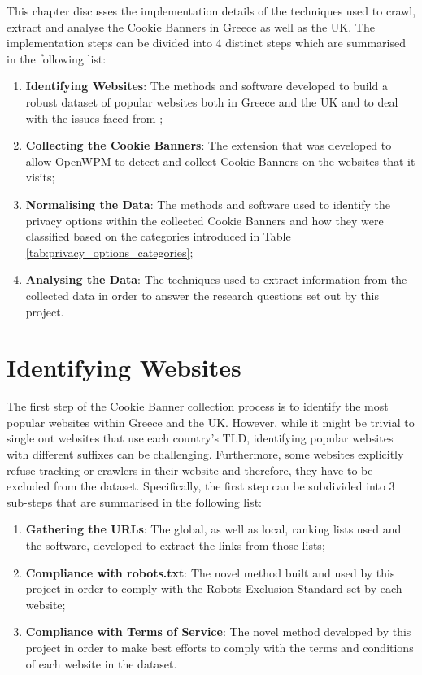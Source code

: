 \documentclass[../main.tex]{subfiles}
\begin{document}
This chapter discusses the implementation details of the techniques used to crawl, extract and analyse the Cookie Banners in Greece as well as the UK. The implementation steps can be divided into 4 distinct steps which are summarised in the following list:

\begin{enumerate}
    \item \textbf{Identifying Websites}: The methods and software developed to build a robust dataset of popular websites both in Greece and the UK and to deal with the issues faced from ;
    
    \item \textbf{Collecting the Cookie Banners}: The extension that was developed to allow OpenWPM to detect and collect Cookie Banners on the websites that it visits;
    
    \item \textbf{Normalising the Data}: The methods and software used to identify the privacy options within the collected Cookie Banners and how they were classified based on the categories introduced in Table \ref{tab:privacy_options_categories};
    
    \item \textbf{Analysing the Data}: The techniques used to extract information from the collected data in order to answer the research questions set out by this project.
\end{enumerate}

\section{Identifying Websites}
The first step of the Cookie Banner collection process is to identify the most popular websites within Greece and the UK. However, while it might be trivial to single out websites that use each country’s TLD, identifying popular websites with different suffixes can be challenging. Furthermore, some websites explicitly refuse tracking or crawlers in their website and therefore, they have to be excluded from the dataset. Specifically, the first step can be subdivided into 3 sub-steps that are summarised in the following list:

\begin{enumerate}
    \item \textbf{Gathering the URLs}: The global, as well as local, ranking lists used and the software, developed to extract the links from those lists;
    
    \item \textbf{Compliance with robots.txt}: The novel method built and used by this project in order to comply with the Robots Exclusion Standard set by each website;
    
    \item \textbf{Compliance with Terms of Service}: The novel method developed by this project in order to make best efforts to comply with the terms and conditions of each website in the dataset.
\end{enumerate}
\end{document}

